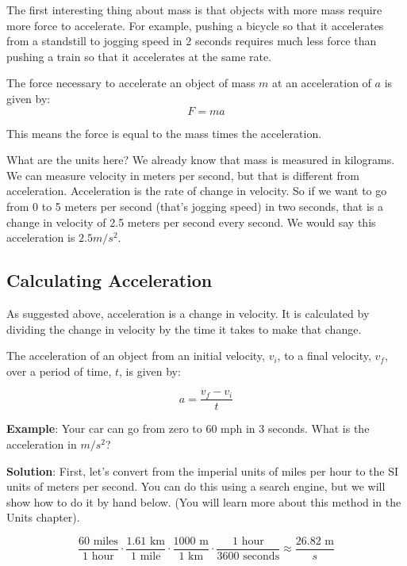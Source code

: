 The first interesting thing about mass is that objects with more mass
require more force to accelerate. For example, pushing a bicycle so
that it accelerates from a standstill to jogging speed in 2 seconds
requires much less force than pushing a train so that it accelerates
at the same rate.


\begin{mdframed}[style=important, frametitle={Newton's Second Law of Motion}]

The force necessary to accelerate an object of mass $m$ at an acceleration of
$a$ is given by:
$$F = m a$$

This means the force is equal to the mass times the acceleration.

\end{mdframed}

What are the units here? We already know that mass is measured in
kilograms. We can measure velocity in meters per second, but that is
different from acceleration. Acceleration is the rate of change in
velocity. So if we want to go from 0 to 5 meters per second (that's
jogging speed) in two seconds, that is a change in velocity of 2.5
meters per second every second. We would say this acceleration is $2.5
m/s^2$.

\subsection{Calculating Acceleration}
As suggested above, acceleration is a change in velocity. It is calculated by
dividing the change in velocity by the time it takes to make that change.

\begin{mdframed}[style = important, frametitle = {Calculating Acceleration}]
The acceleration of an object from an initial velocity, $v_i$, to a final
velocity, $v_f$, over a period of time, $t$, is given by:

$$a = \frac{v_f - v_i}{t}$$
\end{mdframed}

\textbf{Example}: Your car can go from zero to 60 mph in 3 seconds. What is the
acceleration in $m / s^2$?

\textbf{Solution}: First, let's convert from the imperial units of miles per
hour to the SI units of meters per second. You can do this using a search engine, 
but we will show how to do it by hand below. (You will learn more about this 
method in the Units chapter).

$$\frac{60 \text{ miles}}{1 \text{ hour}} \cdot \frac{1.61 \text{ km}}{1 
\text{ mile}} \cdot \frac{1000\text{ m}}{1\text{ km}} \cdot \frac{1\text{ hour}}{
3600\text{ seconds}} \approx \frac{26.82\text{ m}}{s}$$


